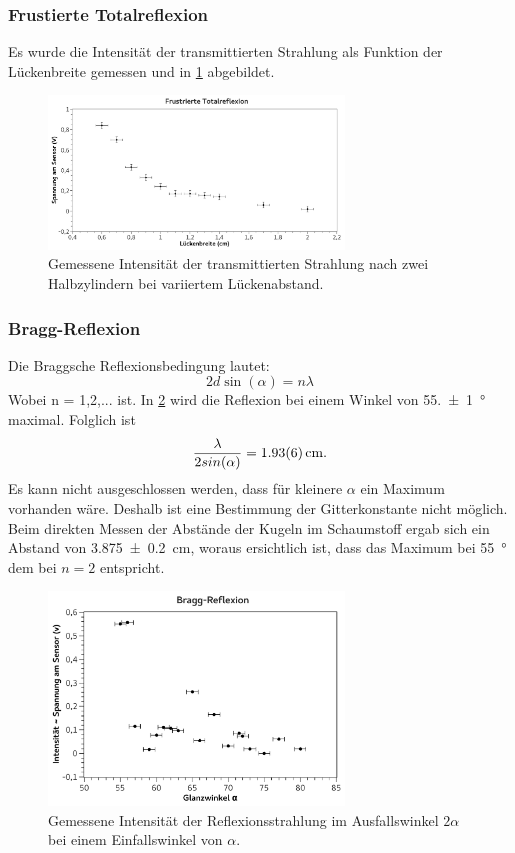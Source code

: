 \documentclass[
	a4paper,
	12pt,
	pagesize,
	ngerman
]{scrartcl}
\begin{document}
	\subsubsection{Frustierte Totalreflexion}
	Es wurde die Intensität der transmittierten Strahlung als Funktion der Lückenbreite gemessen und in \cref{fig_frust_total} abgebildet.
	\begin{figure}[H]
		\includegraphics[width=0.7\textwidth]{fig_frust_total}
		\centering
		\caption{Gemessene Intensität der transmittierten Strahlung nach zwei Halbzylindern bei variiertem Lückenabstand.}
		\label{fig_frust_total}
		\centering
	\end{figure}

	\subsubsection{Bragg-Reflexion}
	Die Braggsche Reflexionsbedingung lautet:
	\begin{equation}
		2d \sin(\alpha) = n \lambda
	\end{equation}
	Wobei n = 1,2,... ist. %
	In \cref{fig_bragg} wird die Reflexion bei einem Winkel von \SI{55,+-1}{\degree} maximal. %
	Folglich ist 
	\begin{equation*}
		\frac{\lambda}{2sin(\alpha)} = \SI{1,93+-0,06}{cm}. %
	\end{equation*}
	Es kann nicht ausgeschlossen werden, dass für kleinere $\alpha$ ein Maximum vorhanden wäre.
	Deshalb ist eine Bestimmung der Gitterkonstante nicht möglich.
	Beim direkten Messen der Abstände der Kugeln im Schaumstoff ergab sich ein Abstand von \SI{3,875+-0,2}{cm}, woraus ersichtlich ist, dass das Maximum bei \SI{55}{\degree} dem bei $n=2$ entspricht. %
	\begin{figure}[H]
		\includegraphics[width=0.7\textwidth]{fig_bragg}
		\centering
		\caption{Gemessene Intensität der Reflexionsstrahlung im Ausfallswinkel $2\alpha$ bei einem Einfallswinkel von $\alpha$.}
		\label{fig_bragg}
		\centering
	\end{figure}
\end{document}
